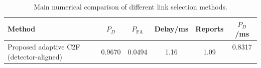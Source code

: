 \begin{table}[t]
    \centering
    \caption{Main numerical comparison of different link selection methods.}
    \label{tab:main_summary}
    \begin{tabular}{l c c c c c}
        \hline
        Method & $P_D$ & $P_{\mathrm{FA}}$ & Delay/ms & Reports & $P_D$/ms \\
        \hline
        Proposed adaptive C2F (detector-aligned) & 0.9670 & 0.0494 & 1.16 & 1.09 & 0.8317 \
        \hline
    \end{tabular}
\end{table}
